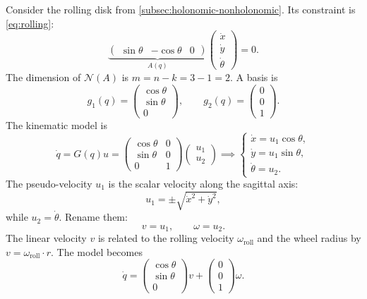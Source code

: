 Consider the rolling disk from
\cref{subsec:holonomic-nonholonomic}. Its constraint is
\cref{eq:rolling}:
\[
\underbrace{
\begin{pmatrix} \sin\theta & -\cos\theta & 0 \end{pmatrix}
}_{A(q)}
\begin{pmatrix} \dot{x} \\ \dot{y} \\ \dot{\theta} \end{pmatrix} = 0.
\]
The dimension of \( \mathcal{N}(A) \) is \( m = n - k = 3 - 1 = 2 \).
A basis is
\[
g_1(q) = \begin{pmatrix} \cos\theta \\ \sin\theta \\ 0 \end{pmatrix},
\qquad
g_2(q) = \begin{pmatrix} 0 \\ 0 \\ 1 \end{pmatrix}.
\]
The kinematic model is
\begin{equation}
    \dot{q} = G(q) u =
    \begin{pmatrix}
        \cos\theta & 0 \\
        \sin\theta & 0 \\
        0 & 1
    \end{pmatrix}
    \begin{pmatrix} u_1 \\ u_2 \end{pmatrix}
    \implies
    \begin{cases}
        \dot{x} = u_1 \cos\theta, \\
        \dot{y} = u_1 \sin\theta, \\
        \dot{\theta} = u_2.
    \end{cases}
\end{equation}
The pseudo-velocity \( u_1 \) is the scalar velocity along the sagittal
axis:
\[
u_1 = \pm\sqrt{\dot{x}^2 + \dot{y}^2},
\]
while \( u_2 = \dot{\theta} \). Rename them:
\[
v = u_1, \qquad \omega = u_2.
\]
The linear velocity \( v \) is related to the rolling velocity
\( \omega_{\text{roll}} \) and the wheel radius by
\( v = \omega_{\text{roll}} \cdot r \). The model becomes
\begin{equation}
\label{eq:unicycle}
    \dot{q} = \begin{pmatrix} \cos\theta \\ \sin\theta \\ 0 \end{pmatrix} v
            + \begin{pmatrix} 0 \\ 0 \\ 1 \end{pmatrix} \omega.
\end{equation}

